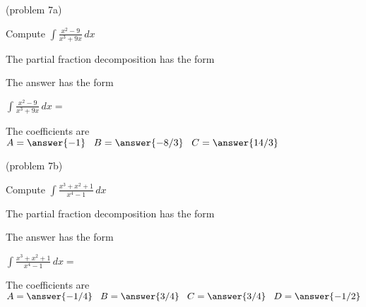 \documentclass{ximera}
\begin{document}
\begin{problem}(problem 7a)

Compute $\displaystyle{\int \frac{x^2 - 9}{x^3 + 9x} \, dx}$

The partial fraction decomposition has the form

\begin{multipleChoice}
\end{multipleChoice}

The answer has the form

$\displaystyle{\int \frac{x^2 - 9}{x^3 + 9x} \, dx=}$

\begin{multipleChoice}
\end{multipleChoice}

The coefficients are\\
$A = \answer{-1} \;\;\; B = \answer{-8/3} \;\;\; C = \answer{14/3}$

\end{problem}




\begin{problem}(problem 7b)

Compute $\displaystyle{\int \frac{x^3 + x^2 + 1}{x^4 - 1} \, dx}$

The partial fraction decomposition has the form

\begin{multipleChoice}
\end{multipleChoice}

The answer has the form

$\displaystyle{\int \frac{x^3 + x^2 + 1}{x^4 - 1} \, dx =}$

\begin{multipleChoice}
\end{multipleChoice}

The coefficients are\\
$A = \answer{-1/4} \;\;\; B = \answer{3/4} \;\;\; C = \answer{3/4} \;\;\; D = \answer{-1/2}$

\end{problem}
\end{document}
